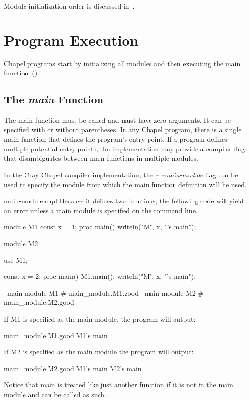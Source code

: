 Module initialization order is discussed
in~.


\section{Program Execution}
\label{Program_Execution}

Chapel programs start by initializing all modules and then executing
the main function~().

\subsection{The {\em main} Function}
\label{The_main_Function}

The main function must be called  and must have zero
arguments.  It can be specified with or without parentheses.  In any
Chapel program, there is a single main function that defines the
program's entry point.  If a program defines multiple potential entry
points, the implementation may provide a compiler flag that
disambiguates between main functions in multiple modules.

\begin{craychapel}
In the Cray Chapel compiler implementation, the \emph{--
--main-module} flag can be used to specify the module from which the
main function definition will be used.
\end{craychapel}

\begin{chapelexample}{main-module.chpl}
Because it defines two  functions, the following code will yield an
error unless a main module is specified on the command line.
\begin{chapel}
module M1 {
  const x = 1;
  proc main() {
    writeln("M", x, "'s main");
  }
}
 
module M2 {
  use M1;

  const x = 2;
  proc main() {
    M1.main();
    writeln("M", x, "'s main");
  }
}
\end{chapel}
\begin{chapelcompopts}
--main-module M1 \# main\_module.M1.good
--main-module M2 \# main\_module.M2.good
\end{chapelcompopts}
If M1 is specified as the main module, the program will output:
\begin{chapelprintoutput}{main_module.M1.good}
M1's main
\end{chapelprintoutput}
If M2 is specified as the main module the program will output:
\begin{chapelprintoutput}{main_module.M2.good}
M1's main
M2's main
\end{chapelprintoutput}
Notice that main is treated like just another function if it is not in
the main module and can be called as such.
\end{chapelexample}

